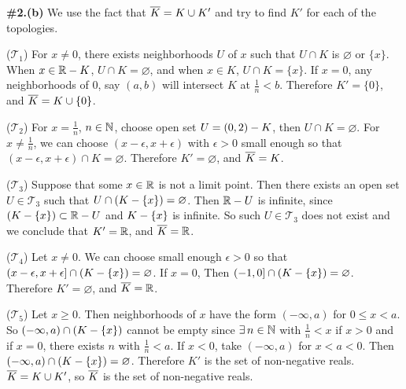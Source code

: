 \documentclass[a4paper,11pt]{article}
\newcommand{\T}{\mathcal{T}}
\begin{document}
\newpage

\phantom{?}
\vspace{5mm}

\begin{minipage}[t][270mm]{90mm}
    {\bfseries \large \#2.(b)} We use the fact that \(\overline{K} = K \cup K'\) and try to find \(K'\) for each of the topologies.

    \bigskip

    (\(\T_1\)) For \(x \neq 0\), there exists neighborhoods \(U\) of \(x\) such that \(U \cap K\) is \(\varnothing\) or \(\{x\}\). When \(x \in \mathbb{R} - K\), \(U \cap K = \varnothing\), and when \(x \in K\), \(U \cap K = \{x\}\). If \(x = 0\), any neighborhoods of \(0\), say \((a, b)\) will intersect \(K\) at \(\frac{1}{n} < b\). Therefore \(K' = \{0\}\), and \(\overline{K} = K \cup \{0\}\).

    \bigskip

    (\(\T_2\)) For \(x = \frac{1}{n}\), \(n \in \mathbb{N}\), choose open set \(U = (0, 2) - K\), then \(U \cap K = \varnothing\). For \(x \neq \frac{1}{n}\), we can choose \((x - \epsilon, x + \epsilon)\) with \(\epsilon > 0\) small enough so that \((x - \epsilon, x + \epsilon) \cap K = \varnothing\). Therefore \(K' = \varnothing\), and \(\overline{K} = K\).

    \bigskip

    (\(\T_3\)) Suppose that some \(x \in \mathbb{R}\) is not a limit point. Then there exists an open set \(U \in \T_3\) such that \(U \cap \left( K - \{x\} \right) = \varnothing\). Then \(\mathbb{R} - U\) is infinite, since \(\left( K - \{x\} \right) \subset \mathbb{R} - U\) and \(K - \{x\}\) is infinite. So such \(U \in \T_3\) does not exist and we conclude that \(K' = \mathbb{R}\), and \(\overline{K} = \mathbb{R}\).

    \bigskip

    (\(\T_4\)) Let \(x \neq 0\). We can choose small enough \(\epsilon > 0\) so that \((x - \epsilon, x + \epsilon] \cap \left( K - \{x\} \right) = \varnothing\). If \(x = 0\), Then \((-1, 0] \cap \left( K - \{x\} \right) = \varnothing\). Therefore \(K' = \varnothing\), and \(\overline{K} = \mathbb{R}\).

    \bigskip

    (\(\T_5\)) Let \(x \geq 0\). Then neighborhoods of \(x\) have the form \((-\infty, a)\) for \(0 \leq x < a\). So \((-\infty, a) \cap \left( K - \{x\} \right)\) cannot be empty since \(\exists n \in \N\) with \(\frac{1}{n} < x\) if \(x > 0\) and if \(x = 0\), there exists \(n\) with \(\frac{1}{n} < a\). If \(x < 0\), take \((-\infty, a)\) for \(x < a < 0\). Then \((-\infty, a) \cap \left( K - \{x\} \right) = \varnothing\). Therefore \(K'\) is the set of non-negative reals. \(\overline{K} = K \cup K'\), so \(\overline{K}\) is the set of non-negative reals.
\end{minipage}
{\color{gray}\vline}
\begin{minipage}[t][270mm]{90mm}
    \phantom{?}
\end{minipage}
\end{document}
